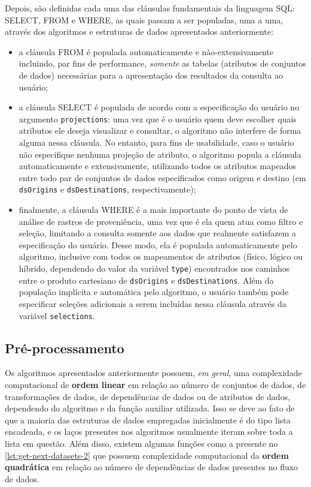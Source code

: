 Depois, são definidas cada uma das cláusulas fundamentais da linguagem SQL: \textsc{SELECT}, \textsc{FROM} e \textsc{WHERE}, as quais passam a ser populadas, uma a uma, através dos algoritmos e estruturas de dados apresentados anteriormente:

\begin{itemize}
    \item a cláusula \textsc{FROM} é populada automaticamente e não-extensivamente incluindo, par fins de performance, \emph{somente} as tabelas (atributos de conjuntos de dados) necessárias para a apresentação dos resultados da consulta ao usuário;
    \item a cláusula \textsc{SELECT} é populada de acordo com a especificação do usuário no argumento \texttt{projections}: uma vez que é o usuário quem deve escolher quais atributos ele deseja visualizar e consultar, o algoritmo não interfere de forma alguma nessa cláusula. No entanto, para fins de usabilidade, caso o usuário não especifique nenhuma projeção de atributo, o algoritmo popula a cláusula automaticamente e extensivamente, utilizando todos os atributos mapeados entre todo par de conjuntos de dados especificados como origem e destino (em \texttt{dsOrigins} e \texttt{dsDestinations}, respectivamente);
    \item finalmente, a cláusula \textsc{WHERE} é a mais importante do ponto de vista de análise de rastros de proveniência, uma vez que é ela quem atua como filtro e seleção, limitando a consulta somente aos dados que realmente satisfazem a especificação do usuário. Desse modo, ela é populada automaticamente pelo algoritmo, inclusive com todos os mapeamentos de atributos (físico, lógico ou híbrido, dependendo do valor da variável \texttt{type}) encontrados nos caminhos entre o produto cartesiano de \texttt{dsOrigins} e \texttt{dsDestinations}. Além da população implícita e automática pelo algoritmo, o usuário também pode especificar seleções adicionais a serem incluídas nessa cláusula através da variável \texttt{selections}.
\end{itemize}

\subsection{Pré-processamento}%
\label{subsec:preprocessamento}

Os algoritmos apresentados anteriormente possuem, \emph{em geral}, uma complexidade computacional de \textbf{ordem linear} em relação ao número de conjuntos de dados, de transformações de dados, de dependências de dados ou de atributos de dados, dependendo do algoritmo e da função auxiliar utilizada. Isso se deve ao fato de que a maioria das estruturas de dados empregadas inicialmente é do tipo lista encadeada, e os laços presentes nos algoritmos usualmente iteram sobre toda a lista em questão. Além disso, existem algumas funções como a presente no \autoref{lst:get-next-datasets-2} que possuem complexidade computacional da \textbf{ordem quadrática} em relação ao número de dependências de dados presentes no fluxo de dados.

